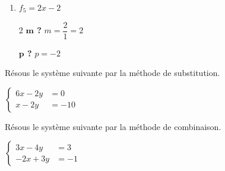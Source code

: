 \documentclass[a4paper, 12pt, parskip=half-]{scrartcl}
\begin{document}
\begin{solution}
\begin{enumerate}
\begin{multicols}{2}
                  \textbf{$\bm{p}$ ?}
                  \medbreak
                  $f_4$ est linéaire $\Rightarrow p=0$
              \end{multicols}
        \item $f_5 = 2x-2 $
              \begin{multicols}{2}
                  \textbf{$\bm{m}$ ?}
                  \medbreak
                  $m=\dfrac{2}{1} = 2$
                  \columnbreak

                  \textbf{$\bm{p}$ ?}
                  \medbreak
                  $p=-2$
              \end{multicols}
    \end{enumerate}
    \newpage
\end{solution}
\begin{exercise}
    Résous le système suivante par la méthode de substitution.

    $\left\{\begin{aligned}
            6x - 2y & = 0  \\
            x-2y    & =-10
        \end{aligned}\right.$
\end{exercise}
\begin{solution}

\end{solution}

\begin{exercise}
    Résous le système suivante par la méthode de combinaison.

    $\left\{\begin{aligned}
            3x - 4y & = 3 \\
            -2x+3y  & =-1
        \end{aligned}\right.$
\end{exercise}
\begin{solution}

\end{solution}
\end{document}
